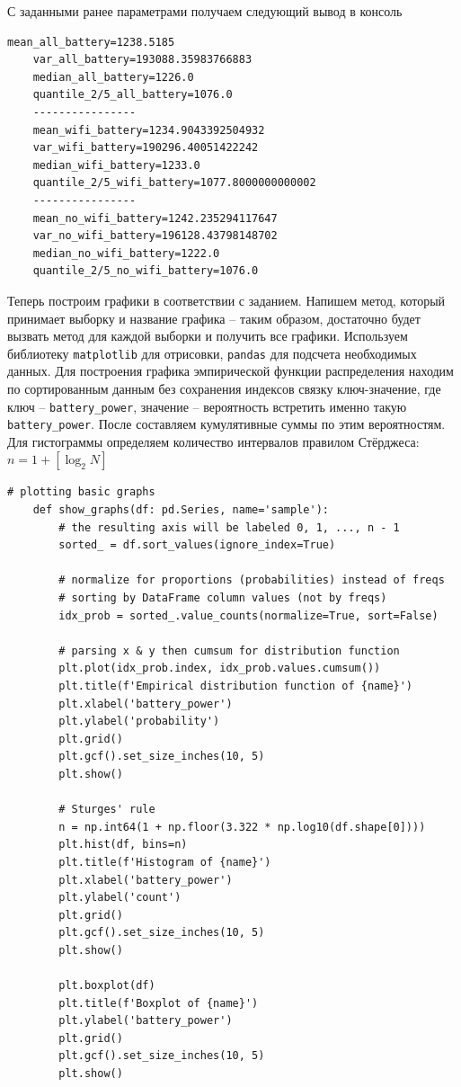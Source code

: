 \documentclass[a4paper, 12pt]{article}
\begin{document}
    С заданными ранее параметрами получаем следующий вывод в консоль
    \begin{lstlisting}[label=mvalsout, caption={Вывод в консоль: посчитанные основные характеристики}]
    mean_all_battery=1238.5185
    var_all_battery=193088.35983766883  
    median_all_battery=1226.0
    quantile_2/5_all_battery=1076.0     
    ----------------
    mean_wifi_battery=1234.9043392504932
    var_wifi_battery=190296.40051422242 
    median_wifi_battery=1233.0
    quantile_2/5_wifi_battery=1077.8000000000002
    ----------------
    mean_no_wifi_battery=1242.235294117647      
    var_no_wifi_battery=196128.43798148702      
    median_no_wifi_battery=1222.0
    quantile_2/5_no_wifi_battery=1076.0
    \end{lstlisting}


    Теперь построим графики в соответствии с заданием.
    Напишем метод, который принимает выборку и название графика -- таким образом, достаточно
    будет вызвать метод для каждой выборки и получить все графики. Используем библиотеку 
    \texttt{matplotlib} для отрисовки, \texttt{pandas} для подсчета необходимых данных.
    Для построения графика эмпирической функции распределения находим
    по сортированным данным без сохранения индексов связку ключ-значение, где ключ --
    \texttt{battery\_{power}}, значение -- вероятность встретить именно такую \texttt{battery\_{power}}.
    После составляем кумулятивные суммы по этим вероятностям. Для гистограммы определяем
    количество интервалов правилом Стёрджеса: $n=1+\left[\log_2{N}\right]$
    \begin{lstlisting}[label=graphs, caption={Код для построения необходимых графиков}]
    # plotting basic graphs
    def show_graphs(df: pd.Series, name='sample'):
        # the resulting axis will be labeled 0, 1, ..., n - 1
        sorted_ = df.sort_values(ignore_index=True)

        # normalize for proportions (probabilities) instead of freqs
        # sorting by DataFrame column values (not by freqs)
        idx_prob = sorted_.value_counts(normalize=True, sort=False)

        # parsing x & y then cumsum for distribution function
        plt.plot(idx_prob.index, idx_prob.values.cumsum())
        plt.title(f'Empirical distribution function of {name}')
        plt.xlabel('battery_power')
        plt.ylabel('probability')
        plt.grid()
        plt.gcf().set_size_inches(10, 5)
        plt.show()

        # Sturges' rule
        n = np.int64(1 + np.floor(3.322 * np.log10(df.shape[0])))
        plt.hist(df, bins=n)
        plt.title(f'Histogram of {name}')
        plt.xlabel('battery_power')
        plt.ylabel('count')
        plt.grid()
        plt.gcf().set_size_inches(10, 5)
        plt.show()

        plt.boxplot(df)
        plt.title(f'Boxplot of {name}')
        plt.ylabel('battery_power')
        plt.grid()
        plt.gcf().set_size_inches(10, 5)
        plt.show()
    \end{lstlisting}
\end{document}
